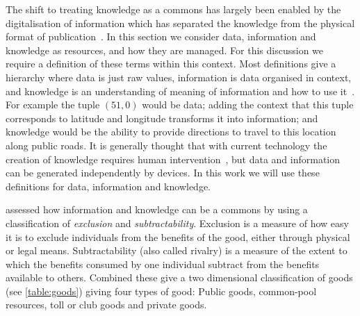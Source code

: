 The shift to treating knowledge as a commons has largely been enabled by the digitalisation of information which has separated the knowledge from the physical format of publication~\citep{Ostrom2003}. 
In this section we consider data, information and knowledge as resources, and how they are managed. 
For this discussion we require a definition of these terms within this context.
Most definitions give a hierarchy where data is just raw values, information is data organised in context, and knowledge is an understanding of meaning of information and how to use it~\citep{Machlup1983,Davenport2000,Shadbolt2013}. For example the tuple $(51,0)$ would be data; adding the context that this tuple corresponds to latitude and longitude transforms it into information; and knowledge would be the ability to provide directions to travel to this location along public roads. It is generally thought that with current technology the creation of knowledge requires human intervention~\citep{Davenport2000}, but data and information can be generated independently by devices. In this work we will use these definitions for data, information and knowledge.

\citet{Ostrom2003} assessed how information and knowledge can be a commons by using a classification of \emph{exclusion} and \emph{subtractability}. 
Exclusion is a measure of how easy it is to exclude individuals from the benefits of the good, either through physical or legal means. 
Subtractability (also called rivalry) is a measure of the extent to which the benefits consumed by one individual subtract from the benefits available to others. 
Combined these give a two dimensional classification of goods (see \autoref{table:goods}) giving four types of good: Public goods, common-pool resources, toll or club goods and private goods.

